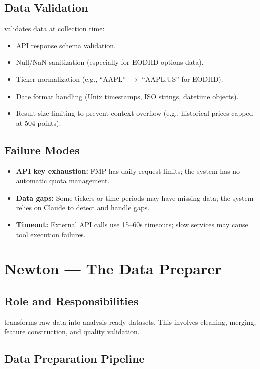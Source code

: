 \subsection{Data Validation}

\turing validates data at collection time:
\begin{itemize}
  \item API response schema validation.
  \item Null/NaN sanitization (especially for EODHD options data).
  \item Ticker normalization (e.g., ``AAPL'' $\to$ ``AAPL.US'' for EODHD).
  \item Date format handling (Unix timestamps, ISO strings, datetime objects).
  \item Result size limiting to prevent context overflow (e.g., historical prices capped at 504 points).
\end{itemize}

\subsection{Failure Modes}

\begin{itemize}
  \item \textbf{API key exhaustion:} FMP has daily request limits; the system has no automatic quota management.
  \item \textbf{Data gaps:} Some tickers or time periods may have missing data; the system relies on Claude to detect and handle gaps.
  \item \textbf{Timeout:} External API calls use 15--60s timeouts; slow services may cause tool execution failures.
\end{itemize}

\section{Newton --- The Data Preparer}
\label{sec:agents:newton}

\subsection{Role and Responsibilities}

\newton transforms raw data into analysis-ready datasets.
This involves cleaning, merging, feature construction, and quality validation.

\subsection{Data Preparation Pipeline}

